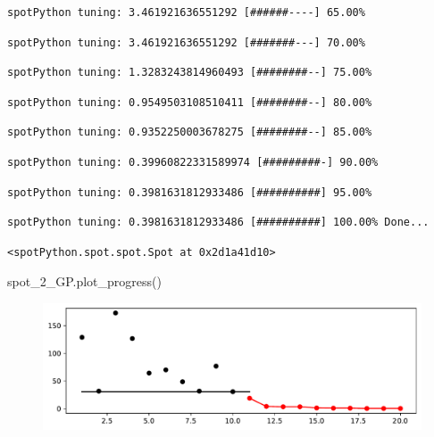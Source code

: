 \documentclass[
  letterpaper,
  DIV=11,
  numbers=noendperiod]{scrreprt}
\newenvironment{Shaded}{\begin{snugshade}}{\end{snugshade}}
\newcommand{\NormalTok}[1]{\textcolor[rgb]{0.00,0.23,0.31}{#1}}
\begin{document}
\begin{verbatim}
spotPython tuning: 3.461921636551292 [######----] 65.00% 
\end{verbatim}

\begin{verbatim}
spotPython tuning: 3.461921636551292 [#######---] 70.00% 
\end{verbatim}

\begin{verbatim}
spotPython tuning: 1.3283243814960493 [########--] 75.00% 
\end{verbatim}

\begin{verbatim}
spotPython tuning: 0.9549503108510411 [########--] 80.00% 
\end{verbatim}

\begin{verbatim}
spotPython tuning: 0.9352250003678275 [########--] 85.00% 
\end{verbatim}

\begin{verbatim}
spotPython tuning: 0.39960822331589974 [#########-] 90.00% 
\end{verbatim}

\begin{verbatim}
spotPython tuning: 0.3981631812933486 [##########] 95.00% 
\end{verbatim}

\begin{verbatim}
spotPython tuning: 0.3981631812933486 [##########] 100.00% Done...
\end{verbatim}

\begin{verbatim}
<spotPython.spot.spot.Spot at 0x2d1a41d10>
\end{verbatim}

\begin{Shaded}
\begin{Highlighting}[]
\NormalTok{spot\_2\_GP.plot\_progress()}
\end{Highlighting}
\end{Shaded}

\begin{figure}[H]

{\centering \includegraphics{010_num_spot_sklearn_surrogate_files/figure-pdf/cell-18-output-1.pdf}

}

\end{figure}
\end{document}

